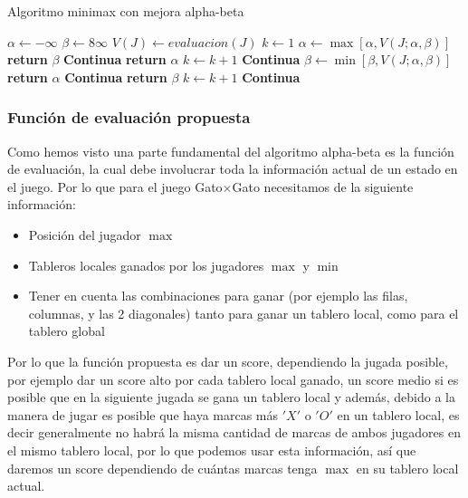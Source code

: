 \documentclass[runningheads]{llncs}
\begin{document}
\begin{algorithm}[H]
\caption{Algoritmo minimax con mejora alpha-beta}\label{alg:2}
\begin{algorithmic}
\State $\alpha \gets -\infty$
\State $\beta \gets 8\infty$
    \State $V(J) \gets evaluacion(J)$
\State $k \gets 1$
        \State $\alpha \gets  \max [\alpha, V(J;\alpha,\beta)]$
        \If{$\alpha \geq \beta$}
            \State \textbf{return} $ \beta$
        \Else
            \State \textbf{Continua}
        \EndIf
            \State \textbf{return} $\alpha$
        \Else
            \State $k \gets k+1$
            \State \textbf{Continua}
        \EndIf
    \EndIf
        \State $\beta \gets \min[\beta,V(J;\alpha,\beta)]$
        \If{$\beta \leq \alpha$}
            \State \textbf{return} $\alpha$
        \Else
            \State \textbf{Continua}
        \EndIf
            \State \textbf{return} $\beta$
        \Else
            \State $k \gets k+1$
            \State \textbf{Continua}
        \EndIf
    \EndIf
\EndIf 
\end{algorithmic}
\end{algorithm}
\subsubsection{Función de evaluación propuesta}
Como hemos visto una parte fundamental del algoritmo alpha-beta es la función de evaluación, la cual debe involucrar toda la información actual de un estado en el juego. Por lo que para el juego Gato$\times$Gato necesitamos de la siguiente información:
\begin{itemize}
    \item Posición del jugador $\max$
    \item Tableros locales ganados por los jugadores $\max$ y $\min$
    \item Tener en cuenta las combinaciones para ganar (por ejemplo las filas, columnas, y las 2 diagonales) tanto para ganar un tablero local, como para el tablero global
\end{itemize}
Por lo que la función propuesta es dar un score, dependiendo la jugada posible, por ejemplo dar un score alto por cada tablero local ganado, un score medio si es posible que en la siguiente jugada se gana un tablero local y además, debido a la manera de jugar es posible que haya marcas más $'X'$ o $'O'$ en un tablero local, es decir generalmente no habrá la misma cantidad de marcas de ambos jugadores en el mismo tablero local, por lo que podemos usar esta información, así que daremos un score dependiendo de cuántas marcas tenga $\max$ en su tablero local actual. 
\end{document}
